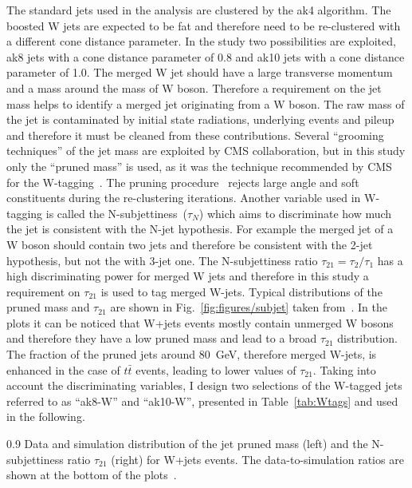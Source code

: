 The standard jets used in the analysis are clustered by the ak4 algorithm. The boosted W jets are expected to be fat and therefore need to be re-clustered with a different cone distance parameter. In the study two possibilities are exploited, ak8 jets with a cone distance parameter  of 0.8 and ak10 jets with a cone distance parameter of 1.0. The merged W jet should have a large transverse momentum and a mass around the mass of W boson. Therefore a requirement on the jet mass helps to identify a merged jet originating from a W boson. The raw mass of the jet is contaminated by initial state radiations, underlying events and pileup and therefore it must be cleaned from these contributions. Several ``grooming techniques'' of the jet mass are exploited by CMS collaboration, but in this study only the ``pruned mass'' is used, as it was the technique recommended by CMS for the W-tagging~\cite{website:Wtagging}. The pruning procedure~\cite{Ellis:2009su} rejects large angle and soft constituents during the re-clustering iterations. Another variable used in W-tagging is called the N-subjettiness~($\tau_{N}$) which aims to discriminate how much the jet is consistent with the N-jet hypothesis. For example the merged jet of a W boson should contain two jets and therefore be consistent with the 2-jet hypothesis, but  not the with 3-jet one. The N-subjettiness ratio $\tau_{21} = \tau_{2}/\tau_{1}$ has a high discriminating power for merged W jets and therefore in this study a requirement on $\tau_{21}$ is used to tag merged W-jets. Typical distributions of the pruned mass and  $\tau_{21}$ are shown in Fig.~\ref{fig:figures/subjet} taken from~\cite{Khachatryan:2014vla}. In the plots it can be noticed that  W+jets events mostly contain unmerged W bosons and therefore they have a low pruned mass and lead to a broad $\tau_{21}$ distribution. The fraction of the pruned jets around 80~GeV, therefore merged W-jets, is enhanced in the case of $t\bar{t}$ events, leading to lower values of $\tau_{21}$. Taking into account the discriminating variables, I design two selections of the W-tagged jets referred to as ``ak8-W'' and ``ak10-W'', presented in Table~\ref{tab:Wtags} and used in the following.


                 {0.9}       %
                 {Data and simulation distribution of the jet pruned mass (left) and the N-subjettiness ratio $\tau_{21}$ (right) for W+jets events. The data-to-simulation ratios are shown at the bottom of the plots~\cite{Khachatryan:2014vla}.}

